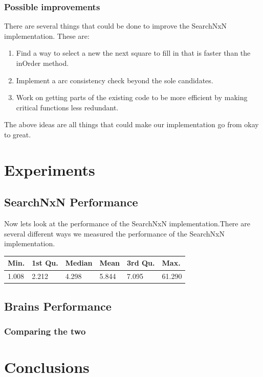 \documentclass[letterpaper]{article}
\begin{document}
\subsubsection{Possible improvements}
There are several things that could be done to improve the SearchNxN implementation. These are:
\begin{enumerate}
\item Find a way to select a new the next square to fill in that is faster than the inOrder method.
\item Implement a arc consistency check beyond the sole candidates.
\item Work on getting parts of the existing code to be more efficient by making critical functions less redundant. 
\end{enumerate}
The above ideas are all things that could make our implementation go from okay to great.

\section{Experiments}

\subsection{SearchNxN Performance}
Now lets look at the performance of the SearchNxN implementation.There are several different ways we measured the performance of the SearchNxN implementation.

\begin{tabular}{|l|l|l|l|l|l|}
\hline
Min. & 1st Qu.  & Median & Mean & 3rd Qu. & Max.\\
\hline
1.008 & 2.212 & 4.298 & 5.844 & 7.095 & 61.290\\
\hline
\end{tabular}

\subsection{Brains Performance}

\subsubsection{Comparing the two}

\section{Conclusions}
\end{document}

